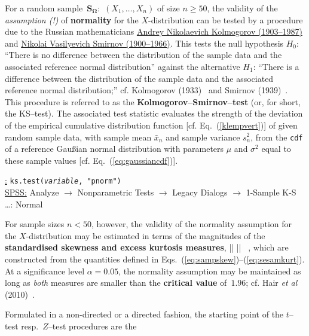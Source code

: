 \medskip
\noindent
For a random sample~$\boldsymbol{S_{\Omega}}$:~$(X_{1}, \ldots, 
X_{n})$ of size $n \geq 50$, the validity of the \textit{assumption 
(!)} of \textbf{normality} for the $X$-distribution can be tested
by a procedure due to the Russian mathematicians
\href{http://www-history.mcs.st-and.ac.uk/Biographies/Kolmogorov.html}{Andrey Nikolaevich Kolmogorov (1903--1987)} 
and 
\href{http://en.wikipedia.org/wiki/Nikolai_Smirnov_(mathematician)}
{Nikolai Vasilyevich Smirnov (1900--1966)}. This tests the null 
hypothesis $H_{0}$: ``There is no difference between the 
distribution of the sample data and the associated reference 
normal distribution'' against the alternative $H_{1}$: ``There is 
a difference between the distribution of the sample data and the 
associated reference normal distribution;''
cf. Kolmogorov (1933)~ and Smirnov 
(1939)~. This procedure is referred to as the
\textbf{Kolmogorov--Smirnov--test} (or, for short, the KS--test).
The associated test statistic evaluates the strength of the
deviation of the empirical cumulative distribution function [cf. 
Eq.~(\ref{klempvert})] of given random sample data, with sample 
mean $\bar{x}_{n}$ and sample variance $s_{n}^{2}$, from the
\texttt{cdf} of a reference Gau\ss ian normal distribution with
parameters $\mu$ and $\sigma^{2}$ equal to these sample values [cf. 
Eq.~(\ref{eq:gaussiancdf})].

\medskip
\noindent
\underline{\R:} \texttt{ks.test(\textit{variable}, "pnorm")} \\
\underline{SPSS:} Analyze $\rightarrow$ Nonparametric Tests
$\rightarrow$ Legacy Dialogs $\rightarrow$ 1-Sample K-S \ldots: 
Normal

\medskip
\noindent
For sample sizes $n < 50$, however, the validity of the normality 
assumption for the $X$-distribution may be estimated in terms of 
the magnitudes of the \textbf{standardised skewness and excess
kurtosis measures},
%
\be
{}
\left|\right|
\quad\quad{}\quad\quad
\left|\right| \ ,
\ee
%
which are constructed from the quantities defined in
Eqs.~(\ref{eq:sampskew})--(\ref{eq:sesamkurt}).
At a significance level $\alpha = 0.05$, the normality assumption 
may be maintained as long as \textit{both} measures are smaller
than the \textbf{critical value} of~$1.96$; cf. Hair \textit{et al} 
(2010)~.

\medskip
\noindent
Formulated in a non-directed or a directed fashion, the starting 
point of the $t$--test resp.~$Z$--test procedures are the

